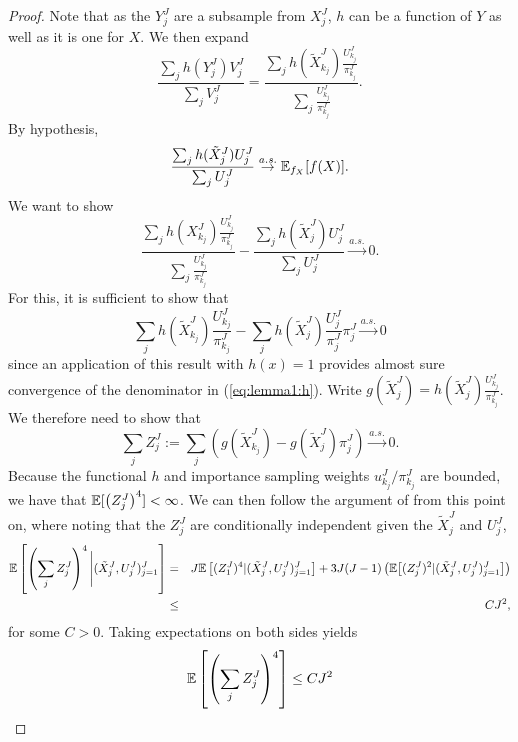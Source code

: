 \begin{proof}
    Note that as the $Y_j^J$ are a subsample from $X_j^J$, $h$ can be a function of $Y$ as well as it is one for $X$. We then expand
    \begin{equation}\frac{\sum_j h(Y_j^J) V_j^J}{\sum_j V_j^J} = \frac{\sum_j h(\tilde X_{k_j}^J)\frac{U_{k_j}^J}{\pi_{k_j}^J}}{\sum_j \frac{U_{k_j}^J}{\pi_{k_j}^J}}.\end{equation}
    By hypothesis,
    \begin{equation}
    \frac{\sum_j h(\tilde X_j^J)U_j^J}{\sum_j U_j^J} \stackrel{a.s.}{\to} \mathbb{E}_{f_X}[f(X)].
    \end{equation}
    We want to show
    \begin{equation}\label{eq:lemma1:h}
    \frac{\sum_j h(X_{k_j}^J)\frac{U_{k_j}^J}{\pi_{k_j}^J}}{\sum_j \frac{U_{k_j}^J}{\pi_{k_j}^J}} - \frac{\sum_j h(\tilde X_j^J)U_j^J}{\sum_j U_j^J} \stackrel{a.s.}{\to} 0.
    \end{equation}
    For this, it is sufficient to show that
   \begin{equation} 
   \sum_j h(\tilde X_{k_j}^J)\frac{U_{k_j}^J}{\pi_{k_j}^J}
    -  \sum_j h(\tilde X_j^J)\frac{U_j^J}{\pi_j^J}\pi_j^J \stackrel{a.s.}{\to} 0 
    \end{equation}
    since an application of this result with $h(x)=1$ provides almost sure convergence of the denominator in (\ref{eq:lemma1:h}).
    Write $g(\tilde X_j^J) = h(\tilde X_j^J)\frac{U_{k_j}^J}{\pi_{k_j}^J}$. We therefore need to show that 
    \begin{equation}
    \sum_j Z_j^J := \sum_j \left(g(\tilde X_{k_j}^J) -  g(\tilde X_j^J) \pi_j^J \right) \stackrel{a.s.}{\to} 0.
\end{equation}
    Because the functional $h$ and importance sampling weights $u_{k_j}^J/\pi_{k_j}^J$ are bounded, we have that $\mathbb{E}[\left(Z_j^J\right)^4] < \infty$. We can then follow the argument of \cite{chopin20} from this point on, where noting that the $Z_j^J$ are conditionally independent given the $\tilde{X}_j^J$ and $U_j^J$,
    \begin{eqnarray*} 
    \mathbb{E}\left[\left(\sum_j Z_j^J\right)^4 \Bigg| (\tilde X_j^J,U_j^J)_{j=1}^J \right] 
    &=& J\mathbb{E}\left[(Z_1^J)^4|(\tilde X_j^J,U_j^J)_{j=1}^J\right] + 3J(J-1)\left(\mathbb{E}\big[(Z_j^J)^2|(\tilde X_j^J,U_j^J)_{j=1}^J\big]\right) 
    \\ 
    &\leq& CJ^2,
    \end{eqnarray*}
    for some $C>0$. 
    Taking expectations on both sides yields
    \begin{equation}\mathbb{E}\left[\left(\sum_j Z_j^J\right)^4 \right]  \leq CJ^2\end{equation}

\end{proof}
